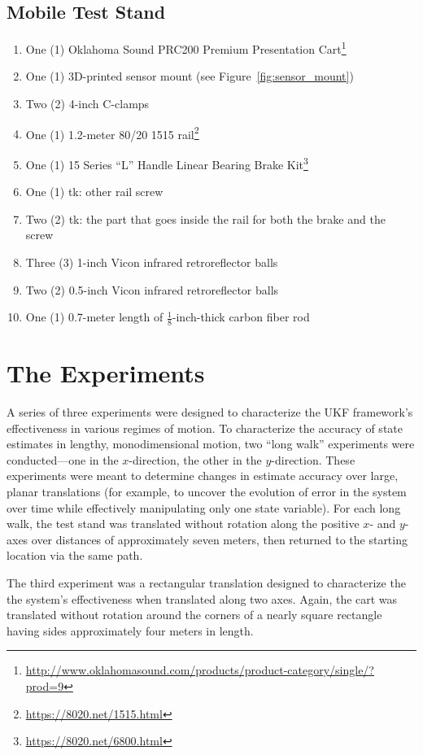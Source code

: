 \subsection{Mobile Test Stand}
\begin{enumerate}
\item One (1) Oklahoma Sound PRC200 Premium Presentation Cart\footnote{\url{http://www.oklahomasound.com/products/product-category/single/?prod=9}}
\item One (1) 3D-printed sensor mount (see Figure~\ref{fig:sensor_mount})
\item Two (2) 4-inch C-clamps
\item One (1) 1.2-meter 80/20 1515 rail\footnote{\url{https://8020.net/1515.html}}
\item One (1) 15 Series ``L'' Handle Linear Bearing Brake Kit\footnote{\url{https://8020.net/6800.html}}
\item One (1) tk: other rail screw
\item Two (2) tk: the part that goes inside the rail for both the brake and the screw
\item Three (3) 1-inch Vicon infrared retroreflector balls
\item Two (2) 0.5-inch Vicon infrared retroreflector balls
\item One (1) 0.7-meter length of $\frac{1}{8}$-inch-thick carbon fiber rod
\end{enumerate}


\section{The Experiments}

A series of three experiments were designed to characterize the UKF framework's effectiveness in various regimes of motion. To characterize the accuracy of state estimates in lengthy, monodimensional motion, two ``long walk'' experiments were conducted---one in the $x$-direction, the other in the $y$-direction. These experiments were meant to determine changes in estimate accuracy over large, planar translations (for example, to uncover the evolution of error in the system over time while effectively manipulating only one state variable). For each long walk, the test stand was translated without rotation along the positive $x$- and $y$-axes over distances of approximately seven meters, then returned to the starting location via the same path.

The third experiment was a rectangular translation designed to characterize the the system's effectiveness when translated along two axes. Again, the cart was translated without rotation around the corners of a nearly square rectangle having sides approximately four meters in length.